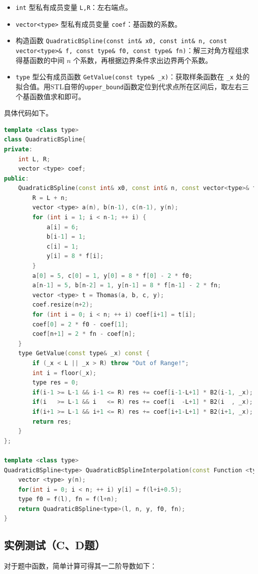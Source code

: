 \documentclass{ctexart}
\begin{document}
\begin{itemize}
\item \verb|int| 型私有成员变量 \verb|L,R|：左右端点。
\item \verb|vector<type>| 型私有成员变量 \verb|coef|：基函数的系数。
\item 构造函数 \verb|QuadraticBSpline(const int& x0, const int& n, const vector<type>& f, const type& f0, const type& fn)|：解三对角方程组求得基函数的中间 $n$ 个系数，再根据边界条件求出边界两个系数。
\item \verb|type| 型公有成员函数 \verb|GetValue(const type& _x)|：获取样条函数在 \verb|_x| 处的拟合值。用STL自带的\verb|upper_bound|函数定位到代求点所在区间后，取左右三个基函数值求和即可。
\end{itemize}

具体代码如下。

\begin{lstlisting}[language={c++}]
template <class type>
class QuadraticBSpline{
private:
	int L, R;
	vector <type> coef;
public:
	QuadraticBSpline(const int& x0, const int& n, const vector<type>& f, const type& f0, const type& fn) : L(x0) {
		R = L + n;
		vector <type> a(n), b(n-1), c(n-1), y(n);
		for (int i = 1; i < n-1; ++ i) {
			a[i] = 6;
			b[i-1] = 1;
			c[i] = 1;
			y[i] = 8 * f[i];
		}
		a[0] = 5, c[0] = 1, y[0] = 8 * f[0] - 2 * f0;
		a[n-1] = 5, b[n-2] = 1, y[n-1] = 8 * f[n-1] - 2 * fn;
		vector <type> t = Thomas(a, b, c, y);
		coef.resize(n+2);
		for (int i = 0; i < n; ++ i) coef[i+1] = t[i];
		coef[0] = 2 * f0 - coef[1];
		coef[n+1] = 2 * fn - coef[n];
	}
	type GetValue(const type& _x) const {
		if (_x < L || _x > R) throw "Out of Range!";
		int i = floor(_x);
		type res = 0;
		if(i-1 >= L-1 && i-1 <= R) res += coef[i-1-L+1] * B2(i-1, _x);
		if(i   >= L-1 && i   <= R) res += coef[i  -L+1] * B2(i  , _x);
		if(i+1 >= L-1 && i+1 <= R) res += coef[i+1-L+1] * B2(i+1, _x);
		return res;
	}
};

template <class type>
QuadraticBSpline<type> QuadraticBSplineInterpolation(const Function <type>& f, const int& l, const int& n) {
	vector <type> y(n);
	for(int i = 0; i < n; ++ i) y[i] = f(l+i+0.5);
	type f0 = f(l), fn = f(l+n);
	return QuadraticBSpline<type>(l, n, y, f0, fn);
}
\end{lstlisting}

\subsection{实例测试（C、D题）}

对于题中函数，简单计算可得其一二阶导数如下：
\end{document}
